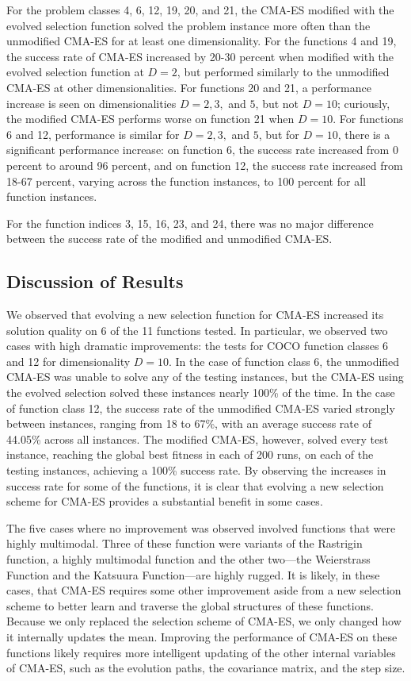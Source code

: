 \documentclass[sigconf]{acmart}
\begin{document}
For the problem classes 4, 6, 12, 19, 20, and 21, the CMA-ES modified with the evolved selection function solved the problem instance more often than the unmodified CMA-ES for at least one dimensionality. For the functions 4 and 19, the success rate of CMA-ES increased by 20-30 percent when modified with the evolved selection function at $D=2$, but performed similarly to the unmodified CMA-ES at other dimensionalities. For functions 20 and 21, a performance increase is seen on dimensionalities $D=2, 3,$ and $5$, but not $D=10$; curiously, the modified CMA-ES performs worse on function 21 when $D=10$. For functions 6 and 12, performance is similar for $D=2, 3,$ and $5$, but for $D=10$, there is a significant performance increase: on function 6, the success rate increased from 0 percent to around 96 percent, and on function 12, the success rate increased from 18-67 percent, varying across the function instances, to 100 percent for all function instances.

For the function indices 3, 15, 16, 23, and 24, there was no major difference between the success rate of the modified and unmodified CMA-ES. 

\subsection{Discussion of Results}
\label{resultsDiscussion}

We observed that evolving a new selection function for CMA-ES increased its solution quality on 6 of the 11 functions tested. In particular, we observed two cases with high dramatic improvements: the tests for COCO function classes 6 and 12 for dimensionality $D=10$. In the case of function class 6, the unmodified CMA-ES was unable to solve any of the testing instances, but the CMA-ES using the evolved selection solved these instances nearly 100\% of the time. In the case of function class 12, the success rate of the unmodified CMA-ES varied strongly between instances, ranging from 18 to 67\%, with an average success rate of 44.05\% across all instances. The modified CMA-ES, however, solved every test instance, reaching the global best fitness in each of 200 runs, on each of the testing instances, achieving a 100\% success rate. By observing the increases in success rate for some of the functions, it is clear that evolving a new selection scheme for CMA-ES provides a substantial benefit in some cases. 

The five cases where no improvement was observed involved functions that were highly multimodal. Three of these function were variants of the Rastrigin function, a highly multimodal function and the other two---the Weierstrass Function and the Katsuura Function---are highly rugged. It is likely, in these cases, that CMA-ES requires some other improvement aside from a new selection scheme to better learn and traverse the global structures of these functions. Because we only replaced the selection scheme of CMA-ES, we only changed how it internally updates the mean. Improving the performance of CMA-ES on these functions likely requires more intelligent updating of the other internal variables of CMA-ES, such as the evolution paths, the covariance matrix, and the step size.
\end{document}
